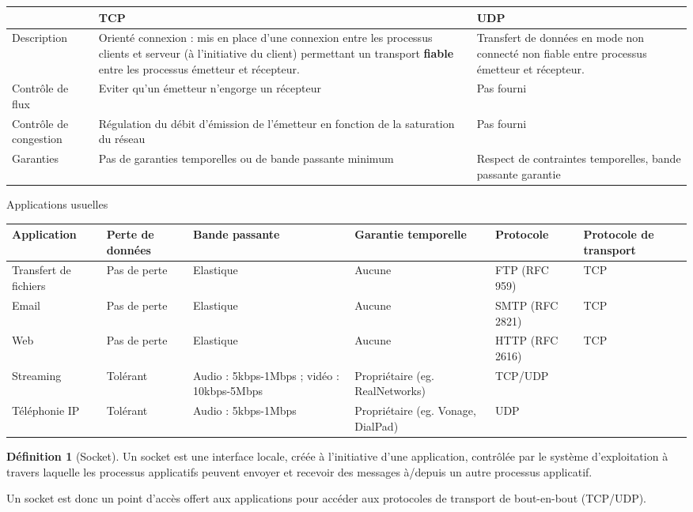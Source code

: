 \documentclass[11pt,english,french]{scrreprt}
\theoremstyle{remark}
\theoremstyle{definition}
\newtheorem*{def*}{Définition}
\begin{document}
\begin{tabularx}{\linewidth}{lXX}
	\toprule
	& TCP & UDP\\
	\midrule
	Description & Orienté connexion : mis en place d'une connexion entre les processus clients et serveur (à l'initiative du client) permettant un transport \textbf{fiable} entre les processus émetteur et récepteur. & Transfert de données en mode non connecté non fiable entre processus émetteur et récepteur.\\
	Contrôle de flux & Eviter qu'un émetteur n'engorge un récepteur & Pas fourni\\
	Contrôle de congestion & Régulation du débit d'émission de l'émetteur en fonction de la saturation du réseau & Pas fourni\\
	Garanties & Pas de garanties temporelles ou de bande passante minimum & Respect de contraintes temporelles, bande passante garantie\\
	\bottomrule
\end{tabularx}

Applications usuelles

\begin{tabularx}{\linewidth}{XXXXXX}
	\toprule
	Application & Perte de données & Bande passante & Garantie temporelle & Protocole & Protocole de transport\\
	\midrule
	Transfert de fichiers & Pas de perte & Elastique & Aucune & FTP (RFC 959) & TCP\\
	Email & Pas de perte & Elastique & Aucune & SMTP (RFC 2821) & TCP\\
	Web & Pas de perte & Elastique & Aucune & HTTP (RFC 2616) & TCP\\
	Streaming & Tolérant & Audio : 5kbps-1Mbps ; vidéo : 10kbps-5Mbps & Propriétaire (eg. RealNetworks) & TCP/UDP\\
	Téléphonie IP & Tolérant & Audio : 5kbps-1Mbps & Propriétaire (eg. Vonage, DialPad) & UDP\\
	\bottomrule 
\end{tabularx}

\begin{def*}[Socket]
	Un socket est une interface locale, créée à l'initiative d'une application, contrôlée par le système d'exploitation à travers laquelle les processus applicatifs peuvent envoyer et recevoir des messages à/depuis un autre processus applicatif. 
	
	Un socket est donc un point d'accès offert aux applications pour accéder aux protocoles de transport de bout-en-bout (TCP/UDP).
\end{def*}
\end{document}
